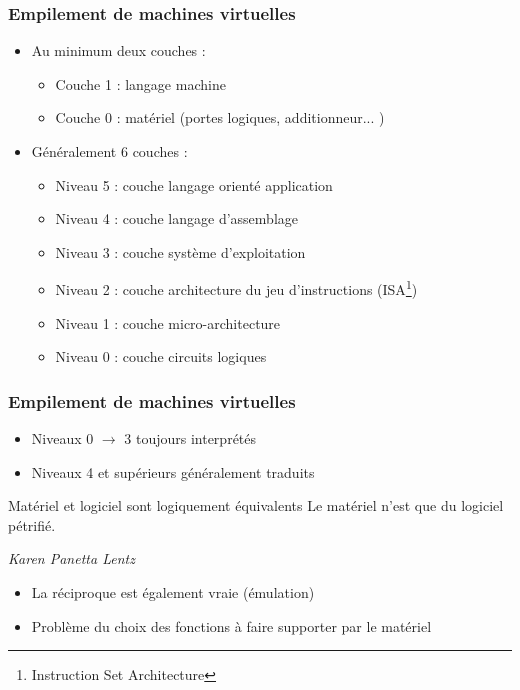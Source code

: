 \begin{frame}
\frametitle{Empilement de machines virtuelles}
\begin{itemize}
\item Au minimum deux couches :
\begin{itemize}
\item Couche 1 : langage machine
\item Couche 0 : matériel (portes logiques, additionneur... )
\end{itemize}
\item Généralement 6 couches \cite{tanen} :
\begin{itemize}
\item Niveau 5 : couche langage orienté application
\item Niveau 4 : couche langage d'assemblage
\item Niveau 3 : couche système d'exploitation
\item Niveau 2 : couche architecture du jeu d'instructions (ISA\footnote{Instruction Set Architecture})
\item Niveau 1 : couche micro-architecture
\item Niveau 0 : couche circuits logiques
\end{itemize}
\end{itemize}
\end{frame}

\begin{frame}
\frametitle{Empilement de machines virtuelles}
\begin{itemize}
\item Niveaux 0 $\rightarrow$ 3 toujours interprétés
\item Niveaux 4 et supérieurs généralement traduits
\end{itemize}
\begin{block}{Matériel et logiciel sont logiquement équivalents}
Le matériel n'est que du logiciel pétrifié.

\textit{Karen Panetta Lentz}
\end{block}
\begin{itemize}
\item La réciproque est également vraie (émulation)
\item Problème du choix des fonctions à faire supporter par le matériel
\end{itemize}
\end{frame}



